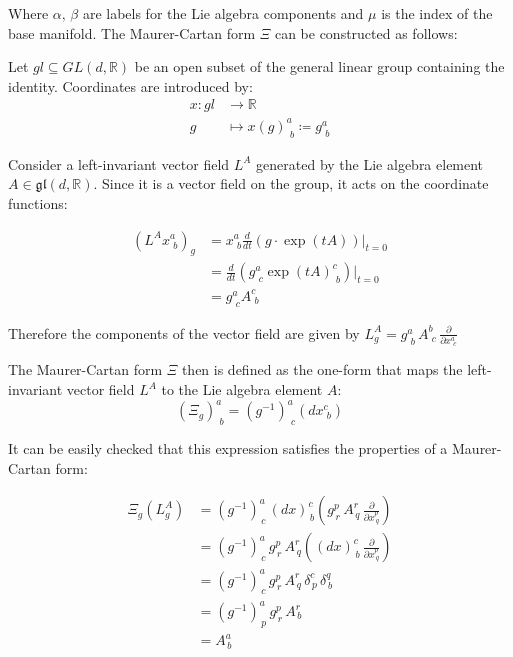 Where $\alpha, \,  \beta$ are labels for the Lie algebra components and $\mu$ is the index of the base manifold. 
The Maurer-Cartan form \( \Xi \) can be constructed as follows:

Let \( gl \subseteq GL(d,\mathbb{R}) \) be an open subset of the general linear group containing the identity. Coordinates are introduced by:
\begin{align*}
  x: gl &\longrightarrow \mathbb{R} \\
  g &\mapsto x(g)^a_{\,\,b} \coloneq g^a_{\,\,b}
\end{align*}

Consider a left-invariant vector field \( L^A \) generated by the Lie algebra element \( A \in \mathfrak{gl}(d, \mathbb{R}) \). Since it is a vector field on the group, it acts on the coordinate functions:

\begin{align*}
  \left( L^A x^a_{\,\,b} \right)_g &= x^a_{\,\,b} \frac{d}{dt} \left( g \cdot \exp(tA) \right) \bigg|_{t=0} \\
  &= \frac{d}{dt} \left( g^a_{\,\,c} \exp(tA)^c_{\,\,b} \right) \bigg|_{t=0} \\
  &= g^a_{\,\,c} A^c_{\,\,b}
\end{align*}


Therefore the components of the vector field are given by \( L^A_g = g^a_{\,\,b} \, A^b_{\,\,c} \, \frac{\partial}{\partial x^a_{\,\,c}} \)\cite{FredericSchullerLocalrepresentationsconnectionbasemanifoldYangMillsfieldsLec222015}

The Maurer-Cartan form $\Xi$ then is defined as the one-form that maps the left-invariant vector field \( L^A \) to the Lie algebra element \( A \):
\[ (\Xi_g)^a_{\,\,b} = (g^{-1})^a_{\,\,c}(dx^c_{\,\,b}) \]

It can be easily checked that this expression satisfies the properties of a Maurer-Cartan form:

\begin{align*}
  \Xi_g(L^A_g) 
  &= (g^{-1})^a_{\,c} \, (dx)^c_{\,b} \left( g^p_{\,r} \, A^r_{\,q} \, \frac{\partial}{\partial x^p_{\,q}} \right) \\
  &= (g^{-1})^a_{\,c} \, g^p_{\,r} \, A^r_{\,q} \left( (dx)^c_{\,b} \, \frac{\partial}{\partial x^p_{\,q}} \right) \\
  &= (g^{-1})^a_{\,c} \, g^p_{\,r} \, A^r_{\,q} \, \delta^c_{\,p} \, \delta^q_{\,b} \\
  &= (g^{-1})^a_{\,p} \, g^p_{\,r} \, A^r_{\,b} \\
  &= A^a_{\,b}
\end{align*}


